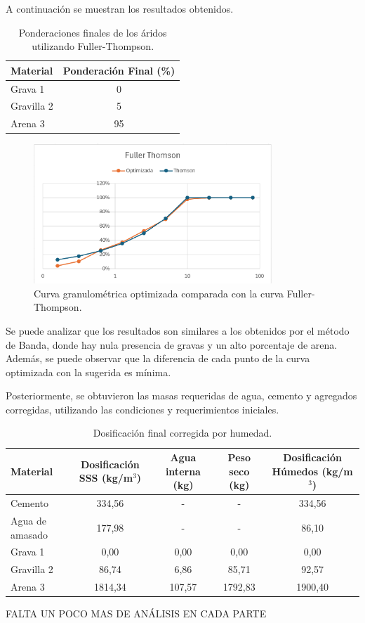 A continuación se muestran los resultados obtenidos.

\begin{table}[H]
\centering
\caption{Ponderaciones finales de los áridos utilizando Fuller-Thompson.}
\begin{tabular}{|l|c|}
\hline
\textbf{Material} & \textbf{Ponderación Final (\%)} \\ \hline
Grava 1     & 0 \\ \hline
Gravilla 2  & 5 \\ \hline
Arena 3     & 95 \\ \hline
\end{tabular}
\end{table}

\begin{figure}[H]
    \centering
    \includegraphics[width=0.8\textwidth]{GRAFICOS/fuller_thompson.png}
    \caption{Curva granulométrica optimizada comparada con la curva Fuller-Thompson.}
\end{figure}

Se puede analizar que los resultados son similares a los obtenidos por el método de Banda, donde hay nula presencia de gravas y un alto porcentaje de arena. Además, se puede observar que la diferencia de cada punto de la curva optimizada con la sugerida es mínima.

Posteriormente, se obtuvieron las masas requeridas de agua, cemento y agregados corregidas, utilizando las condiciones y requerimientos iniciales.

\begin{table}[H]
\centering
\caption{Dosificación final corregida por humedad.}
\begin{tabular}{|l|c|c|c|c|}
\hline
\textbf{Material} & 
\textbf{Dosificación SSS (kg/m$^3$)} & 
\textbf{Agua interna (kg)} & 
\textbf{Peso seco (kg)} & 
\textbf{Dosificación Húmedos (kg/m$^3$)} \\ \hline

Cemento   & 334,56 & -      & -       & 334,56 \\ \hline
Agua de amasado & 177,98 & -      & - & 86,10 \\ \hline
Grava 1   & 0,00   & 0,00   & 0,00   & 0,00 \\ \hline
Gravilla 2 & 86,74  & 6,86   & 85,71  & 92,57 \\ \hline
Arena 3   & 1814,34 & 107,57 & 1792,83 & 1900,40 \\ \hline
\end{tabular}
\end{table}


FALTA UN POCO MAS DE ANÁLISIS EN CADA PARTE







